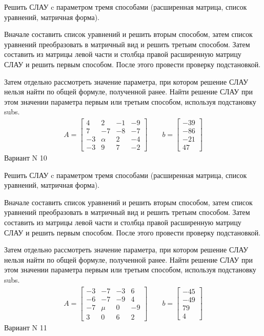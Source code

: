 \documentclass[11pt]{report}
\begin{document}
Решить СЛАУ c параметром тремя способами (расширенная матрица, список уравнений, матричная форма).

Вначале составить список уравнений и решить вторым способом,
затем список уравнений преобразовать в матричный вид и решить третьим способом.
Затем составить из матрицы левой части и столбца правой расширенную матрицу СЛАУ и решить первым способом.
После этого провести проверку подстановкой.

Затем отдельно рассмотреть значение параметра, при котором решение СЛАУ нельзя найти по общей формуле,
полученной ранее.
Найти решение СЛАУ при этом значении параметра первым или третьим способом, используя подстановку subs.
\begin{align*}
    A = \left[\begin{matrix}4 & 2 & -1 & -9\\7 & -7 & -8 & -7\\-3 & \alpha & 2 & -4\\-3 & 9 & 7 & -2\end{matrix}\right]
\qquad b = \left[\begin{matrix}-39\\-86\\-21\\47\end{matrix}\right]
\end{align*}
\newpage
Вариант N 10


Решить СЛАУ c параметром тремя способами (расширенная матрица, список уравнений, матричная форма).

Вначале составить список уравнений и решить вторым способом,
затем список уравнений преобразовать в матричный вид и решить третьим способом.
Затем составить из матрицы левой части и столбца правой расширенную матрицу СЛАУ и решить первым способом.
После этого провести проверку подстановкой.

Затем отдельно рассмотреть значение параметра, при котором решение СЛАУ нельзя найти по общей формуле,
полученной ранее.
Найти решение СЛАУ при этом значении параметра первым или третьим способом, используя подстановку subs.
\begin{align*}
    A = \left[\begin{matrix}-3 & -7 & -3 & 6\\-6 & -7 & -9 & 4\\-7 & \mu & 0 & -9\\3 & 0 & 6 & 2\end{matrix}\right]
\qquad b = \left[\begin{matrix}-45\\-49\\79\\4\end{matrix}\right]
\end{align*}
\newpage
Вариант N 11
\end{document}

